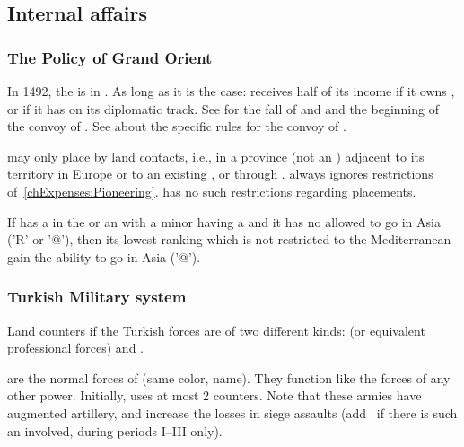 \subsection{Internal affairs}
\subsubsection{The Policy of Grand Orient}
 In 1492, the  is in
. As long as it is the case:
\bparag \TUR receives half of its income if it owns , or if
it has  on its diplomatic track.
\bparag See  for the fall of  and
 and the beginning of the convoy of .
\bparag See  about the specific rules for the
convoy of .

 \TUR may only place \COL by land contacts,
i.e., in a province (not an \Area) adjacent to its territory in Europe
or to an existing \COL, or through .
\bparag \TUR always ignores restrictions
of~\ref{chExpenses:Pioneering}.
\bparag \TUR has no such restrictions regarding \TP placements.

\aparag If \TUR has a \TP in the \ROTW or an \dipAT with a minor
having a \TP and it has no \LeaderA allowed to go in Asia ('R' or '@'),
then its lowest ranking \LeaderA which is not restricted to the
Mediterranean gain the ability to go in Asia ('@').
\subsubsection{Turkish Military system}

Land counters if the Turkish forces are of two different kinds:
\Janissaire (or equivalent professional forces) and \Timar.

\bparag[Janissaries] \Janissaire are the normal forces of \TUR (same
color, name). They function like the forces of any other power.
Initially, \TUR uses at most 2 \Janissaire \ARMY counters.  Note that
these armies have augmented artillery, and increase the losses in siege
assaults (add \td\ if there is such an \ARMY\faceplus involved, during
periods I--III only).

